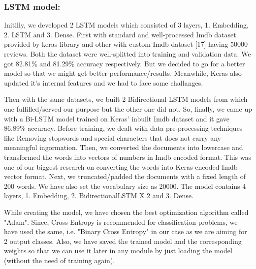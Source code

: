\documentclass[sigplan,screen]{acmart}
\begin{document}
\subsubsection{LSTM model:}

Initilly, we developed 2 LSTM models which consisted of 3 layers, 
1. Embedding, 2. LSTM and 3. Dense. 
First with standard and well-processed Imdb dataset provided by keras library and other with custom Imdb dataset [17] having 50000 reviews. Both the dataset were well-splitted into training and validation data. We got 82.81\% and 81.29\% accuracy respectively. But we decided to go for a better model so that we might get better performance/results. Meanwhile, Keras also updated it's internal features and we had to face some challanges. 

Then with the same datasets, we built 2 Bidirectional LSTM models from which one fulfilled/served our purpose but the other one did not. So, finally, we came up with a Bi-LSTM model trained on Keras' inbuilt Imdb dataset and it gave 86.89\% accuracy. Before training, we dealt with data pre-processing techniques like Removing stopwords and special characters that does not carry any meaningful ingormation. Then, we converted the documents into lowercase and transformed the words into vectors of numbers in Imdb encoded format. This was one of our biggest research on converting the words into Keras encoded Imdb vector format. Next, we truncated/padded the documents with a fixed length of 200 words. We have also set the vocabulary size as 20000. The model contains 4 layers, 
1. Embedding, 2. BidirectionalLSTM X 2 and 3. Dense.

While creating the model, we have chosen the best optimization algorithm called "Adam". Since, Cross-Entropy is recommended for classification problems, we have used the same, i.e. "Binary Cross Entropy" in our case as we are aiming for 2 output classes. Also, we have saved the trained model and the corresponding weights so that we can use it later in any module by just loading the model (without the need of training again).
\end{document}
